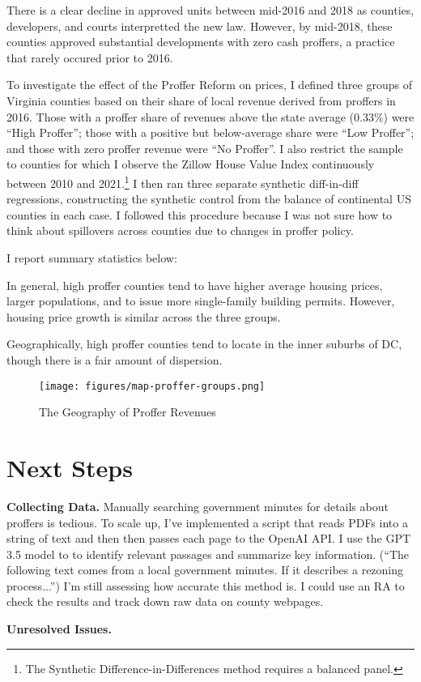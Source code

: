 \documentclass[12pt]{article}
\begin{document}
There is a clear decline in approved units between mid-2016 and 2018 as counties, developers, and courts interpretted the new law. However, by mid-2018, these counties approved substantial developments with zero cash proffers, a practice that rarely occured prior to 2016.

To investigate the effect of the Proffer Reform on prices, I defined three groups of Virginia counties based on their share of local revenue derived from proffers in 2016. Those with a proffer share of revenues above the state average (0.33\%) were ``High Proffer''; those with a positive but below-average share were ``Low Proffer''; and those with zero proffer revenue were ``No Proffer''. I also restrict the sample to counties for which I observe the Zillow House Value Index continuously between 2010 and 2021.\footnote{The Synthetic Difference-in-Differences method requires a balanced panel.} I then ran three separate synthetic diff-in-diff regressions, constructing the synthetic control from the balance of continental US counties in each case. I followed this procedure because I was not sure how to think about spillovers across counties due to changes in proffer policy.

I report summary statistics below:



In general, high proffer counties tend to have higher average housing prices, larger populations, and to issue more single-family building permits. However, housing price growth is similar across the three groups.

Geographically, high proffer counties tend to locate in the inner suburbs of DC, though there is a fair amount of dispersion.

\begin{figure}
    \centering
    \caption{The Geography of Proffer Revenues}
    \texttt{[image: figures/map-proffer-groups.png]}
\end{figure}

\section{Next Steps}

\textbf{Collecting Data.} Manually searching government minutes for details about proffers is tedious. To scale up, I've implemented a script that reads PDFs into a string of text and then then passes each page to the OpenAI API. I use the GPT 3.5 model to to identify relevant passages and summarize key information. (``The following text comes from a local government minutes. If it describes a rezoning process...'') I'm still assessing how accurate this method is. I could use an RA to check the results and track down raw data on county webpages.

\textbf{Unresolved Issues.} 

\clearpage
\end{document}
